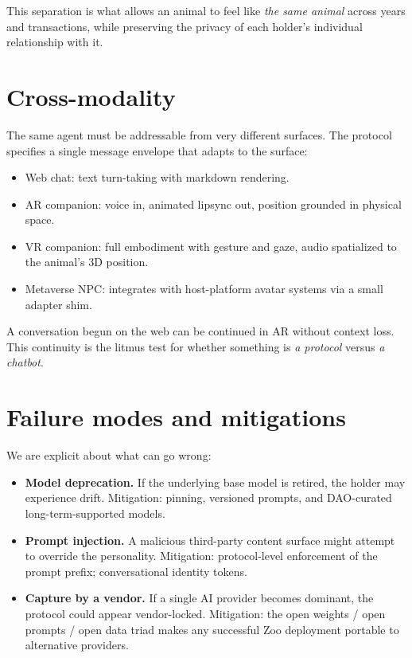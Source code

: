 \documentclass[11pt,letterpaper]{article}
\begin{document}
This separation is what allows an animal to feel like \emph{the same animal} across years and transactions, while preserving the privacy of each holder's individual relationship with it.

\section{Cross-modality}

The same agent must be addressable from very different surfaces. The protocol specifies a single message envelope that adapts to the surface:

\begin{itemize}
  \item Web chat: text turn-taking with markdown rendering.
  \item AR companion: voice in, animated lipsync out, position grounded in physical space.
  \item VR companion: full embodiment with gesture and gaze, audio spatialized to the animal's 3D position.
  \item Metaverse NPC: integrates with host-platform avatar systems via a small adapter shim.
\end{itemize}

A conversation begun on the web can be continued in AR without context loss. This continuity is the litmus test for whether something is \emph{a protocol} versus \emph{a chatbot}.

\section{Failure modes and mitigations}

We are explicit about what can go wrong:

\begin{itemize}
  \item \textbf{Model deprecation.} If the underlying base model is retired, the holder may experience drift. Mitigation: pinning, versioned prompts, and DAO-curated long-term-supported models.
  \item \textbf{Prompt injection.} A malicious third-party content surface might attempt to override the personality. Mitigation: protocol-level enforcement of the prompt prefix; conversational identity tokens.
  \item \textbf{Capture by a vendor.} If a single AI provider becomes dominant, the protocol could appear vendor-locked. Mitigation: the open weights / open prompts / open data triad makes any successful Zoo deployment portable to alternative providers.
\end{itemize}
\end{document}
